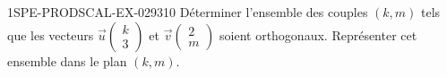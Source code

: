 \begin{exercice}{1SPE-PRODSCAL-EX-029}{3}{10}
Déterminer l'ensemble des couples $(k, m)$ tels que les vecteurs $\vec{u}\begin{pmatrix} k \\ 3 \end{pmatrix}$ et $\vec{v}\begin{pmatrix} 2 \\ m \end{pmatrix}$ soient orthogonaux. Représenter cet ensemble dans le plan $(k, m)$.
\end{exercice}
